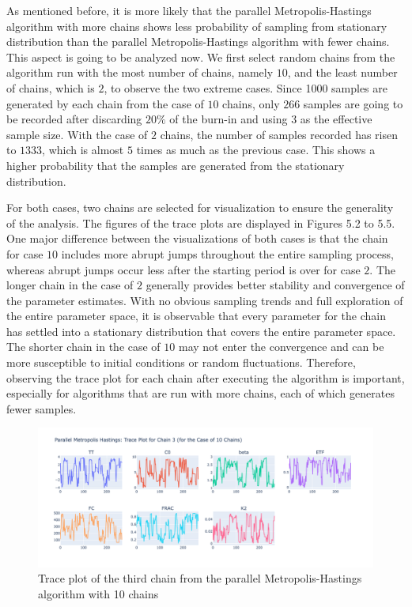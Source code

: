 As mentioned before, it is more likely that the parallel Metropolis-Hastings algorithm with more chains shows less probability of sampling from stationary distribution than the parallel Metropolis-Hastings algorithm with fewer chains. This aspect is going to be analyzed now. We first select random chains from the algorithm run with the most number of chains, namely $10$, and the least number of chains, which is $2$, to observe the two extreme cases. Since 1000 samples are generated by each chain from the case of $10$ chains, only $266$ samples are going to be recorded after discarding $20\%$ of the burn-in and using $3$ as the effective sample size. With the case of $2$ chains, the number of samples recorded has risen to $1333$, which is almost $5$ times as much as the previous case. This shows a higher probability that the samples are generated from the stationary distribution.

For both cases, two chains are selected for visualization to ensure the generality of the analysis. The figures of the trace plots are displayed in Figures 5.2 to 5.5. One major difference between the visualizations of both cases is that the chain for case $10$ includes more abrupt jumps throughout the entire sampling process, whereas abrupt jumps occur less after the starting period is over for case $2$. The longer chain in the case of $2$ generally provides better stability and convergence of the parameter estimates. With no obvious sampling trends and full exploration of the entire parameter space, it is observable that every parameter for the chain has settled into a stationary distribution that covers the entire parameter space. The shorter chain in the case of $10$ may not enter the convergence and can be more susceptible to initial conditions or random fluctuations. Therefore, observing the trace plot for each chain after executing the algorithm is important, especially for algorithms that are run with more chains, each of which generates fewer samples.

\begin{figure}[H]
    \centering
    \includegraphics[width=1\textwidth]{figures/parallel_mh/tp_rand_10_3.png}
    \captionsetup{width=.8\textwidth}
    \caption{Trace plot of the third chain from the parallel Metropolis-Hastings algorithm with 10 chains}
    \label{fig:enter-label}
\end{figure}

